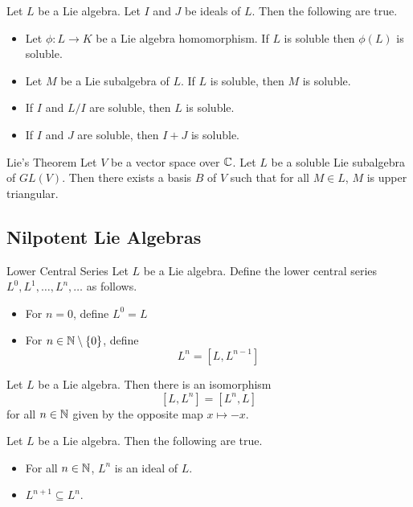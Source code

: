 \documentclass[a4paper]{article}
\begin{document}
\begin{prp}{}{} Let $L$ be a Lie algebra. Let $I$ and $J$ be ideals of $L$. Then the following are true. 
\begin{itemize}
\item Let $\phi:L\to K$ be a Lie algebra homomorphism. If $L$ is soluble then $\phi(L)$ is soluble. 
\item Let $M$ be a Lie subalgebra of $L$. If $L$ is soluble, then $M$ is soluble. 
\item If $I$ and $L/I$ are soluble, then $L$ is soluble. 
\item If $I$ and $J$ are soluble, then $I+J$ is soluble. 
\end{itemize}
\end{prp}

\begin{thm}{Lie's Theorem}{} Let $V$ be a vector space over $\mathbb{C}$. Let $L$ be a soluble Lie subalgebra of $GL(V)$. Then there exists a basis $B$ of $V$ such that for all $M\in L$, $M$ is upper triangular. 
\end{thm}

\subsection{Nilpotent Lie Algebras}
\begin{defn}{Lower Central Series}{} Let $L$ be a Lie algebra. Define the lower central series $L^0,L^1,\dots,L^n,\dots$ as follows. 
\begin{itemize}
\item For $n=0$, define $L^0=L$
\item For $n\in\mathbb{N}\setminus\{0\}$, define $$L^n=[L,L^{n-1}]$$
\end{itemize}
\end{defn}

\begin{lmm}{}{} Let $L$ be a Lie algebra. Then there is an isomorphism $$[L,L^n]=[L^n,L]$$ for all $n\in\mathbb{N}$ given by the opposite map $x\mapsto -x$. 
\end{lmm}

\begin{lmm}{}{} Let $L$ be a Lie algebra. Then the following are true. 
\begin{itemize}
\item For all $n\in\mathbb{N}$, $L^n$ is an ideal of $L$. 
\item $L^{n+1}\subseteq L^n$. 
\end{itemize}
\end{lmm}
\end{document}
